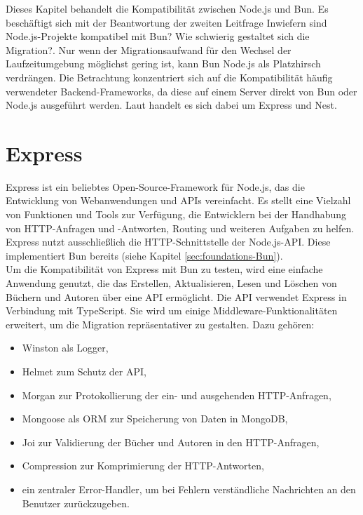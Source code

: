   \label{ch:compabitility}
Dieses Kapitel behandelt die Kompatibilität zwischen Node.js und Bun. Es beschäftigt sich mit der Beantwortung der zweiten Leitfrage \glqq Inwiefern sind Node.js-Projekte kompatibel mit Bun? Wie schwierig gestaltet sich die Migration?\grqq{}. Nur wenn der Migrationsaufwand für den Wechsel der Laufzeitumgebung möglichst gering ist, kann Bun Node.js als Platzhirsch verdrängen. Die Betrachtung konzentriert sich auf die Kompatibilität häufig verwendeter Backend-Frameworks, da diese auf einem Server direkt von Bun oder Node.js ausgeführt werden. Laut \cite{Greif.2022} handelt es sich dabei um Express und Nest.

\section{Express} \label{sec:compabitility-express}
Express ist ein beliebtes Open-Source-Framework für Node.js, das die Entwicklung von Webanwendungen und APIs vereinfacht. Es stellt eine Vielzahl von Funktionen und Tools zur Verfügung, die Entwicklern bei der Handhabung von HTTP-Anfragen und -Antworten, Routing und weiteren Aufgaben zu helfen. Express nutzt ausschließlich die HTTP-Schnittstelle der Node.js-API. Diese implementiert Bun bereits (siehe Kapitel \ref{sec:foundations-Bun}).\cite{Brown.November2019}\\

\noindent 
Um die Kompatibilität von Express mit Bun zu testen, wird eine einfache Anwendung genutzt, die das Erstellen, Aktualisieren, Lesen und Löschen von Büchern und Autoren über eine API ermöglicht. Die API verwendet Express in Verbindung mit TypeScript. Sie wird um einige Middleware-Funktionalitäten erweitert, um die Migration repräsentativer zu gestalten. Dazu gehören:
\begin{itemize}
	\item Winston als Logger,
	\item Helmet zum Schutz der API,
	\item Morgan zur Protokollierung der ein- und ausgehenden HTTP-Anfragen,
	\item Mongoose als ORM zur Speicherung von Daten in MongoDB, 
	\item Joi zur Validierung der Bücher und Autoren in den HTTP-Anfragen,
	\item Compression zur Komprimierung der HTTP-Antworten,
	\item ein zentraler Error-Handler, um bei Fehlern verständliche Nachrichten an den Benutzer zurückzugeben.
\end{itemize}
	

